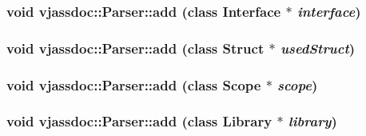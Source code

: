 \hypertarget{classvjassdoc_1_1Parser_8cef84842aa31265b09995ee9eb46414}{
\subsubsection{\setlength{\rightskip}{0pt plus 5cm}void vjassdoc::Parser::add (class {\bf Interface} $\ast$ {\em interface})}}
\label{classvjassdoc_1_1Parser_8cef84842aa31265b09995ee9eb46414}


\hypertarget{classvjassdoc_1_1Parser_12dc09577a80de9cbb73be82717801d8}{
\subsubsection{\setlength{\rightskip}{0pt plus 5cm}void vjassdoc::Parser::add (class {\bf Struct} $\ast$ {\em usedStruct})}}
\label{classvjassdoc_1_1Parser_12dc09577a80de9cbb73be82717801d8}


\hypertarget{classvjassdoc_1_1Parser_6694c7230e7593afc9a2b0a4e7d62223}{
\subsubsection{\setlength{\rightskip}{0pt plus 5cm}void vjassdoc::Parser::add (class {\bf Scope} $\ast$ {\em scope})}}
\label{classvjassdoc_1_1Parser_6694c7230e7593afc9a2b0a4e7d62223}


\hypertarget{classvjassdoc_1_1Parser_687ea929ab18eac54ca8ec7ee11fa6bd}{
\subsubsection{\setlength{\rightskip}{0pt plus 5cm}void vjassdoc::Parser::add (class {\bf Library} $\ast$ {\em library})}}
\label{classvjassdoc_1_1Parser_687ea929ab18eac54ca8ec7ee11fa6bd}


